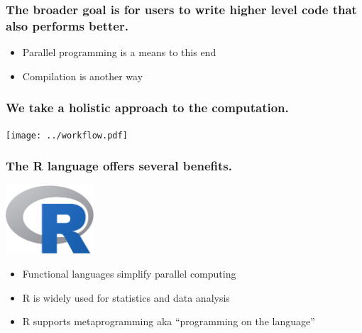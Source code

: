 \documentclass{beamer}
\begin{document}
\begin{frame}

    \frametitle{The broader goal is for users to write higher level code
    that also performs better.}

    \begin{itemize}
        \item Parallel programming is a means to this end
        \item Compilation is another way
    \end{itemize}

\end{frame}
\begin{frame}

    \frametitle{We take a holistic approach to the computation.}

\centerline{\texttt{[image: ../workflow.pdf]}}


\end{frame}
\begin{frame}

    \frametitle{The R language offers several benefits.}

\centerline{\includegraphics[height=1in]{Rlogo.png}}

    \begin{itemize}
        \item Functional languages simplify parallel computing
        \item R is widely used for statistics and data analysis
        \item R supports metaprogramming aka ``programming on the
            language''
    \end{itemize}

\end{frame}
\end{document}
